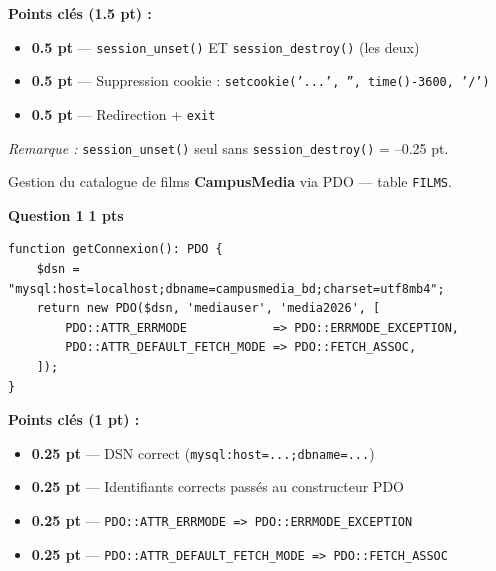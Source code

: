 \documentclass[11pt,a4paper]{article}
\newcommand{\pts}[1]{%
  \hfill\colorbox{pointsbg}{\textcolor{uirgold}{\bfseries\small #1 pts}}%
}
\begin{document}
\begin{tcolorbox}[notebox]
\textbf{Points clés (1.5 pt) :}
\begin{itemize}[itemsep=1pt, topsep=0pt]
  \item \textbf{0.5 pt} --- \texttt{session\_unset()} ET \texttt{session\_destroy()} (les deux)
  \item \textbf{0.5 pt} --- Suppression cookie : \texttt{setcookie('...', '', time()-3600, '/')}
  \item \textbf{0.5 pt} --- Redirection + \texttt{exit}
\end{itemize}
\textit{Remarque :} \texttt{session\_unset()} seul sans \texttt{session\_destroy()} = --0.25 pt.
\end{tcolorbox}

\newpage

\begin{tcolorbox}[exbox, title={Exercice 2 \quad PHP et PDO \hfill /6 pts}]
Gestion du catalogue de films \textbf{CampusMedia} via PDO --- table \texttt{FILMS}.
\end{tcolorbox}

\noindent\textbf{Question 1}\pts{1}

\begin{tcolorbox}[corrbox, title={Corrigé Q1 --- getConnexion()}]
\begin{lstlisting}[language=PHP2]
function getConnexion(): PDO {
    $dsn = "mysql:host=localhost;dbname=campusmedia_bd;charset=utf8mb4";
    return new PDO($dsn, 'mediauser', 'media2026', [
        PDO::ATTR_ERRMODE            => PDO::ERRMODE_EXCEPTION,
        PDO::ATTR_DEFAULT_FETCH_MODE => PDO::FETCH_ASSOC,
    ]);
}
\end{lstlisting}
\end{tcolorbox}

\begin{tcolorbox}[notebox]
\textbf{Points clés (1 pt) :}
\begin{itemize}[itemsep=1pt, topsep=0pt]
  \item \textbf{0.25 pt} --- DSN correct (\texttt{mysql:host=...;dbname=...})
  \item \textbf{0.25 pt} --- Identifiants corrects passés au constructeur PDO
  \item \textbf{0.25 pt} --- \texttt{PDO::ATTR\_ERRMODE => PDO::ERRMODE\_EXCEPTION}
  \item \textbf{0.25 pt} --- \texttt{PDO::ATTR\_DEFAULT\_FETCH\_MODE => PDO::FETCH\_ASSOC}
\end{itemize}
\end{tcolorbox}
\end{document}
